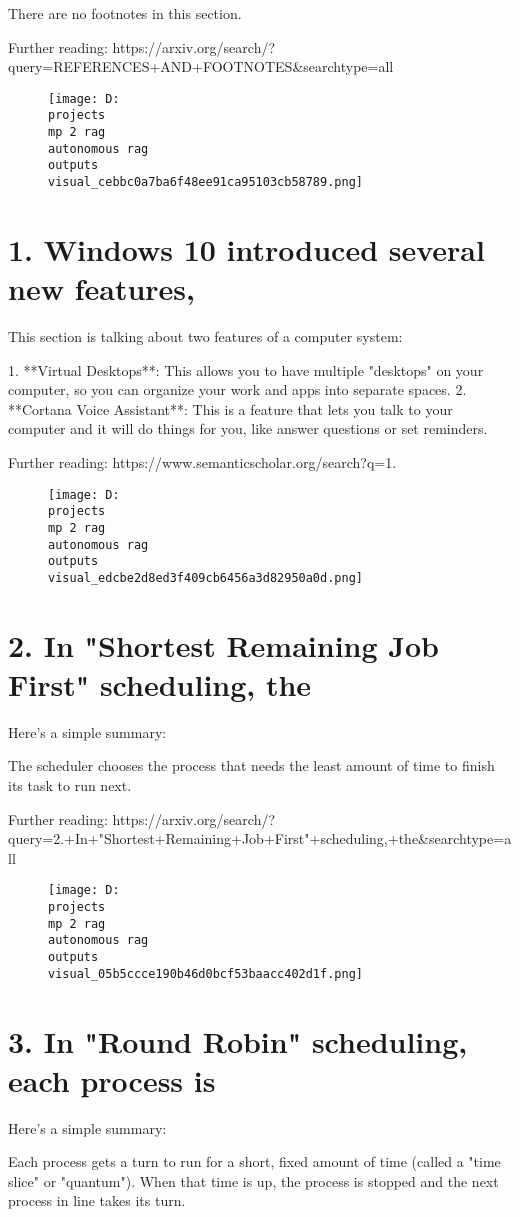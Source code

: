 \documentclass[12pt,a4paper]{article}
\begin{document}
There are no footnotes in this section.

Further reading: https://arxiv.org/search/?query=REFERENCES+AND+FOOTNOTES&searchtype=all
\begin{figure}[h]
\centering
\texttt{[image: D:\\projects\\mp 2 rag\\autonomous rag\\outputs\\visual\_cebbc0a7ba6f48ee91ca95103cb58789.png]}
\end{figure}
\section{1. Windows 10 introduced several new features,}
This section is talking about two features of a computer system:

1. **Virtual Desktops**: This allows you to have multiple "desktops" on your computer, so you can organize your work and apps into separate spaces.
2. **Cortana Voice Assistant**: This is a feature that lets you talk to your computer and it will do things for you, like answer questions or set reminders.

Further reading: https://www.semanticscholar.org/search?q=1.%
\begin{figure}[h]
\centering
\texttt{[image: D:\\projects\\mp 2 rag\\autonomous rag\\outputs\\visual\_edcbe2d8ed3f409cb6456a3d82950a0d.png]}
\end{figure}
\section{2. In "Shortest Remaining Job First" scheduling, the}
Here's a simple summary:

The scheduler chooses the process that needs the least amount of time to finish its task to run next.

Further reading: https://arxiv.org/search/?query=2.+In+"Shortest+Remaining+Job+First"+scheduling,+the&searchtype=all
\begin{figure}[h]
\centering
\texttt{[image: D:\\projects\\mp 2 rag\\autonomous rag\\outputs\\visual\_05b5ccce190b46d0bcf53baacc402d1f.png]}
\end{figure}
\section{3. In "Round Robin" scheduling, each process is}
Here's a simple summary:

Each process gets a turn to run for a short, fixed amount of time (called a "time slice" or "quantum"). When that time is up, the process is stopped and the next process in line takes its turn.
\end{document}
